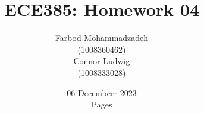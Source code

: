 \documentclass{article}
\title{ECE385: Homework 04}
\author{Farbod Mohammadzadeh\\
    (1008360462)\\
    Connor Ludwig\\
    (1008333028)\\}
\date{06 Decemberr 2023\\ \pageref{LastPage} Pages}
\begin{document}
\large
\maketitle
\newpage

\newpage

\newpage

\end{document}
